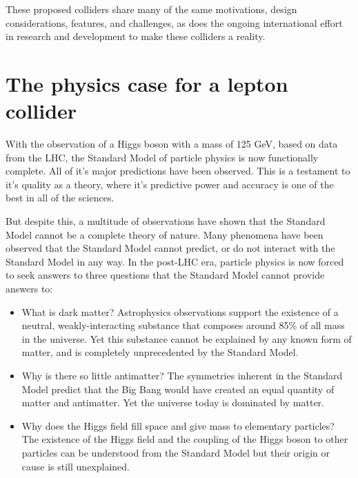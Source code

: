 These proposed colliders share many of the same motivations, design considerations, features, and challenges, as does the ongoing international effort in research and development to make these colliders a reality.

\section{The physics case for a lepton collider}
With the observation of a Higgs boson with a mass of 125 GeV, based on data from the \acrlong{LHC}, the Standard Model of particle physics is now functionally complete. All of it's major predictions have been observed. This is a testament to it's quality as a theory, where it's predictive power and accuracy is one of the best in all of the sciences.

But despite this, a multitude of observations have shown that the Standard Model cannot be a complete theory of nature. Many phenomena have been observed that the Standard Model cannot predict, or do not interact with the Standard Model in any way. In the post-LHC era, particle physics is now forced to seek answers to three questions that the Standard Model cannot provide answers to:

\begin{itemize}
	\item What is dark matter? Astrophysics observations support the existence of a neutral, weakly-interacting substance that composes around 85\% of all mass in the universe. Yet this substance cannot be explained by any known form of matter, and is completely unprecedented by the Standard Model.
	\item Why is there so little antimatter? The symmetries inherent in the Standard Model predict that the Big Bang would have created an equal quantity of matter and antimatter. Yet the universe today is dominated by matter.
	\item Why does the Higgs field fill space and give mass to elementary particles? The existence of the Higgs field and the coupling of the Higgs boson to other particles can be understood from the Standard Model but their origin or cause is still unexplained.
\end{itemize}

